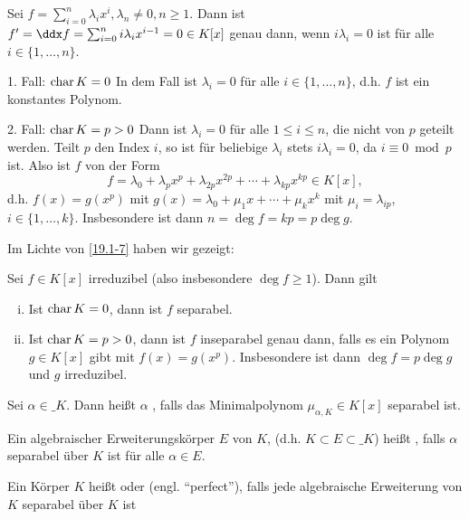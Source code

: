 Sei $f = \sum_{i=0}^n \lambda_i x^i, \lambda_n \neq 0, n \ge 1$.
Dann ist $f' = \ddx f = \sum_{i=0}^n i \lambda_i x^{i-1} = 0 \in K[x]$ genau dann, wenn $i \lambda_i = 0$ ist für alle $i \in \{1, \dotsc, n\}$.
\begin{seg}{1. Fall: $\operatorname{char} K = 0$}
	In dem Fall ist $\lambda_i = 0$ für alle $i \in \{1, \dotsc, n\}$, d.h. $f$ ist ein konstantes Polynom.
\end{seg}
\begin{seg}{2. Fall: $\operatorname{char} K = p > 0$}
	Dann ist $\lambda_i = 0$ für alle $1 \le i \le n$, die nicht von $p$ geteilt werden.
	Teilt $p$ den Index $i$, so ist für beliebige $\lambda_i$ stets $i \lambda_i = 0$, da $i \equiv 0 \bmod p$ ist.
	Also ist $f$ von der Form
	\[
		f = \lambda_0 + \lambda_p x^p + \lambda_{2p} x^{2p} + \dotsb + \lambda_{kp} x^{kp} \in K[x],
	\]
	d.h. $f(x) = g(x^p)$ mit $g(x) = \lambda_0 + \mu_1 x + \dotsb + \mu_k x^k$ mit $\mu_i = \lambda_{ip}$, $i \in \{1, \dotsc, k\}$.
	Insbesondere ist dann $n = \deg f = kp = p \deg g$.
\end{seg}

Im Lichte von \ref{19.1-7} haben wir gezeigt:

\begin{st} \label{dup:19.1-8}
	Sei $f \in K[x]$ irreduzibel (also insbesondere $\deg f \ge 1$).
	Dann gilt
	\begin{enumerate}[i)]
		\item
			Ist $\operatorname{char} K = 0$, dann ist $f$ separabel.
		\item
			Ist $\operatorname{char} K = p > 0$, dann ist $f$ inseparabel genau dann, falls es ein Polynom $g \in K[x]$ gibt mit $f(x) = g(x^p)$.
			Insbesondere ist dann $\deg f = p \deg g$ und $g$ irreduzibel.
	\end{enumerate}
\end{st}

\begin{df} \label{dup:19.1-9}
	Sei $\alpha \in \_K$.
	Dann heißt $\alpha$ , falls das Minimalpolynom $\mu_{\alpha, K} \in K[x]$ separabel ist.

	Ein algebraischer Erweiterungskörper $E$ von $K$, (d.h. $K \subset E \subset \_K$) heißt , falls $\alpha$ separabel über $K$ ist für alle $\alpha \in E$.

	Ein Körper $K$ heißt  oder  (engl. “perfect”), falls jede algebraische Erweiterung von $K$ separabel über $K$ ist
\end{df}

